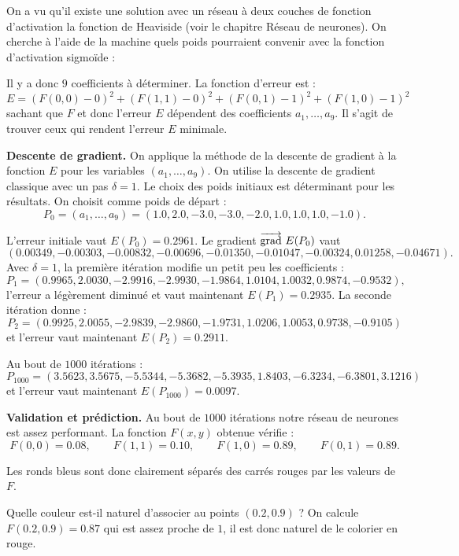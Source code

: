 {On a vu qu'il existe une solution avec un réseau à deux couches de fonction d'activation la fonction de Heaviside (voir le chapitre \og{}Réseau de neurones\fg{}).
On cherche à l'aide de la machine quels poids pourraient convenir avec la fonction d'activation sigmoïde :

Il y a donc $9$ coefficients à déterminer.
La fonction d'erreur est :
$$E = (F(0,0) - 0)^2 + (F(1,1) - 0)^2 + (F(0,1)-1)^2 + (F(1,0) - 1)^2$$
sachant que $F$ et donc l'erreur $E$ dépendent des coefficients $a_1,\ldots,a_9$.
Il s'agit de trouver ceux qui rendent l'erreur $E$ minimale.

\bigskip

\textbf{Descente de gradient.}
On applique la méthode de la descente de gradient à la fonction $E$ pour les variables $(a_1,\ldots,a_9)$.
On utilise la descente de gradient classique avec un pas $\delta = 1$. 
Le choix des poids initiaux est déterminant pour les résultats.
On choisit comme poids de départ :
$$P_0 = (a_1,\ldots,a_9) = (1.0, 2.0, -3.0, -3.0, -2.0, 1.0, 1.0, 1.0, -1.0).$$


L'erreur initiale vaut $E(P_0) = 0.2961$.
Le gradient $\overrightarrow{\textup{grad}}\  E(P_0)$ vaut 
$$(0.00349, -0.00303, -0.00832, -0.00696, -0.01350, -0.01047, -0.00324, 0.01258, -0.04671).$$
Avec $\delta = 1$, la première itération modifie un petit peu les coefficients :
$$P_1 = (0.9965, 2.0030, -2.9916, -2.9930, -1.9864, 1.0104, 1.0032, 0.9874, -0.9532),$$
l'erreur a légèrement diminué et vaut maintenant $E(P_1) = 0.2935$.
La seconde itération donne :
$$P_2 = (0.9925, 2.0055, -2.9839, -2.9860, -1.9731, 1.0206, 1.0053, 0.9738, -0.9105)$$
et l'erreur vaut maintenant $E(P_2) = 0.2911$.

Au bout de $1000$ itérations :
$$P_{1000} = (3.5623, 3.5675, -5.5344, -5.3682, -5.3935, 1.8403, -6.3234, -6.3801, 3.1216)$$
et l'erreur vaut maintenant $E(P_{1000}) = 0.0097$.

\bigskip

\textbf{Validation et prédiction.}
Au bout de $1000$ itérations notre réseau de neurones est assez performant.
La fonction $F(x,y)$ obtenue vérifie :
$$F(0,0) = 0.08, \qquad F(1,1) = 0.10, \qquad F(1,0) = 0.89,  \qquad F(0,1) = 0.89.$$

Les ronds bleus sont donc clairement séparés des carrés rouges par les valeurs de $F$.

Quelle couleur est-il naturel d'associer au points $(0.2,0.9)$ ?
On calcule $F(0.2,0.9) = 0.87$ qui est assez proche de $1$, il est donc naturel de le colorier en rouge.

}
